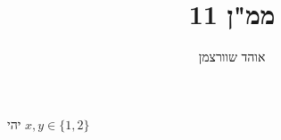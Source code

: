 \documentclass[a4paper]{article}
\title{ממ"ן 11}
\author{אוהד שוורצמן}
\begin{document}
 
\begin{otherlanguage}{hebrew}
\maketitle{}

יהי \(x, y \in \{1, 2\}\)

\end{otherlanguage}
\end{document}
